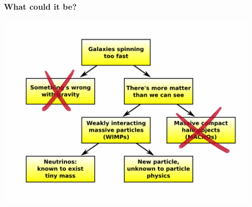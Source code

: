 \documentclass[compress]{beamer}
\begin{document}
\begin{frame}
\frametitle{What could it be?}
\begin{center}
\includegraphics[width=\linewidth]{pictures/flow_chart_3.png}
\end{center}
\end{frame}
\end{document}
